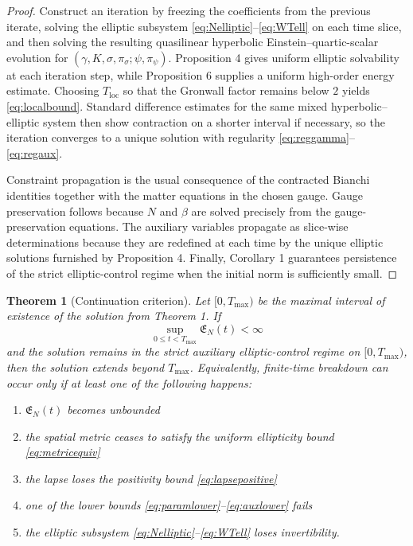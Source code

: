 \documentclass[11pt]{article}
\newtheorem{theorem}{Theorem}
\begin{document}
\begin{proof}
Construct an iteration by freezing the coefficients from the previous iterate, solving the elliptic subsystem \eqref{eq:Nelliptic}--\eqref{eq:WTell} on each time slice, and then solving the resulting quasilinear hyperbolic Einstein--quartic-scalar evolution for \((\gamma,K,\sigma,\pi_\sigma;\psi,\pi_\psi)\). Proposition 4 gives uniform elliptic solvability at each iteration step, while Proposition 6 supplies a uniform high-order energy estimate. Choosing \(T_{\mathrm{loc}}\) so that the Gronwall factor remains below \(2\) yields \eqref{eq:localbound}. Standard difference estimates for the same mixed hyperbolic--elliptic system then show contraction on a shorter interval if necessary, so the iteration converges to a unique solution with regularity \eqref{eq:reggamma}--\eqref{eq:regaux}.

Constraint propagation is the usual consequence of the contracted Bianchi identities together with the matter equations in the chosen gauge. Gauge preservation follows because \(N\) and \(\beta\) are solved precisely from the gauge-preservation equations. The auxiliary variables propagate as slice-wise determinations because they are redefined at each time by the unique elliptic solutions furnished by Proposition 4. Finally, Corollary 1 guarantees persistence of the strict elliptic-control regime when the initial norm is sufficiently small.
\end{proof}

\begin{theorem}[Continuation criterion]
Let \([0,T_{\max})\) be the maximal interval of existence of the solution from Theorem 1. If
\begin{equation}
\sup_{0\le t<T_{\max}}\mathfrak E_N(t)<\infty
\label{eq:Enbounded}
\end{equation}
and the solution remains in the strict auxiliary elliptic-control regime on \([0,T_{\max})\), then the solution extends beyond \(T_{\max}\). Equivalently, finite-time breakdown can occur only if at least one of the following happens:
\begin{enumerate}
    \item \(\mathfrak E_N(t)\) becomes unbounded
    \item the spatial metric ceases to satisfy the uniform ellipticity bound \eqref{eq:metricequiv}
    \item the lapse loses the positivity bound \eqref{eq:lapsepositive}
    \item one of the lower bounds \eqref{eq:paramlower}--\eqref{eq:auxlower} fails
    \item the elliptic subsystem \eqref{eq:Nelliptic}--\eqref{eq:WTell} loses invertibility.
\end{enumerate}
\end{theorem}
\end{document}
